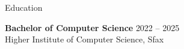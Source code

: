 \documentclass{resume}
\begin{document}

\begin{rSection}{Education}

{\bf Bachelor of Computer Science} \hfill {2022 -- 2025} \\
Higher Institute of Computer Science, Sfax

\end{rSection}
\end{document}
